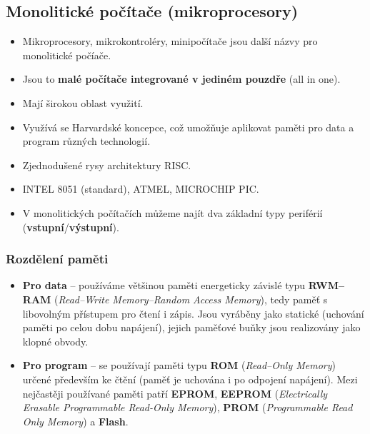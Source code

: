 \subsection{Monolitické počítače (mikroprocesory)}
\begin{itemize}
\item Mikroprocesory, mikrokontroléry, minipočítače jsou další názvy pro monolitické počíače.
\item Jsou to \textbf{malé počítače integrované v jediném pouzdře} (all in one).
\item Mají širokou oblast využití.
\item Využívá se Harvardské koncepce, což umožňuje aplikovat paměti pro data a program různých technologií.
\item Zjednodušené rysy architektury RISC.
\item INTEL 8051 (standard), ATMEL, MICROCHIP PIC.
\item V monolitických počítačích můžeme najít dva základní typy periférií (\textbf{vstupní}/\textbf{výstupní}).
\end{itemize}
 
 \subsubsection{Rozdělení paměti}
\begin{itemize}
		\item \textbf{Pro data} -- používáme většinou paměti energeticky závislé typu \textbf{RWM--RAM} (\textit{Read--Write Memory--Random Access Memory}), tedy paměť s libovolným přístupem pro čtení i zápis. Jsou vyráběny jako statické (uchování paměti po celou dobu napájení), jejich paměťové buňky jsou realizovány jako klopné obvody. 
		\item \textbf{Pro program} -- se používají paměti typu \textbf{ROM} (\textit{Read--Only Memory}) určené především ke čtění (paměť je uchována i po odpojení napájení). Mezi nejčastěji používané paměti patří \textbf{EPROM}, \textbf{EEPROM} (\textit{Electrically Erasable Programmable Read-Only Memory}), \textbf{PROM} (\textit{Programmable Read Only Memory}) a \textbf{Flash}.
\end{itemize}

